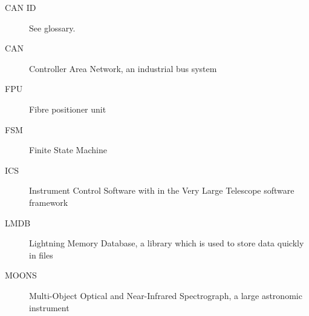 \documentclass[fontsize=12,a4paper]{scrreprt}
\begin{document}
\begin{description}
\item[CAN ID] See glossary.
\item[CAN] Controller Area Network, an industrial bus system
\item[FPU] Fibre positioner unit
\item[FSM] Finite State Machine
\item[ICS] Instrument Control Software with in the Very Large Telescope software framework
\item[LMDB] Lightning Memory Database, a library which is used to store data quickly in files
\item[MOONS] Multi-Object Optical and Near-Infrared Spectrograph, a large astronomic instrument
\end{description}

\cleardoublepage
{}

\printindex
\end{document}
